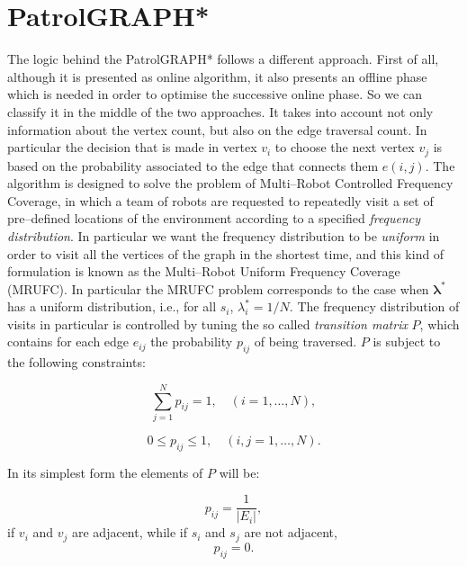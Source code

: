 \section{PatrolGRAPH*}

The logic behind the PatrolGRAPH* follows a different approach. First of all, although it is presented as online algorithm, it also presents an offline phase which is needed in order to optimise the successive online phase. So we can classify it in the middle of the two approaches. It takes into account not only information about the vertex count, but also on the edge traversal count. In particular the decision that is made in vertex $v_i$ to choose the next vertex $v_j$ is based on the probability associated to the edge that connects them $e(i,j)$.
The algorithm is designed to solve the problem of Multi--Robot Controlled Frequency Coverage, in which a team of robots are requested to repeatedly visit a set of pre--defined locations of the environment according to a specified \emph{frequency distribution}. In particular we want the frequency distribution to be \emph{uniform} in order to visit all the vertices of the graph in the shortest time, and this kind of formulation is known as the Multi--Robot Uniform Frequency Coverage (MRUFC). In particular the MRUFC problem corresponds to the case when ${\bm{\lambda}}^*$ has a uniform distribution, i.e., for all $s_i$, $\lambda_i^* = 1/N$.  The frequency distribution of visits in particular is controlled by tuning the so called \emph{transition matrix} $P$, which contains for each edge $e_{ij}$ the probability $p_{ij}$ of being traversed. $P$ is subject to the following constraints:

\begin{equation}
\sum\limits_{j=1}^{N} {p_{ij} } = 1, \quad (i=1,\ldots,N),
\label{Pmatrix3b}
\end{equation}

\begin{equation}
0 \leq p_{ij} \leq 1,\quad (i,j=1,\ldots,N). 
\label{Pmatrix3c}
\end{equation}
 
In its simplest form the elements of $P$ will be:

\begin{equation}
p_{ij}=\frac{1}{|E_i|},
\label{eq_adj}
\end{equation}
if $v_i$ and $v_j$ are adjacent, while if $s_i$ and $s_j$ are not adjacent,
\begin{equation}
p_{ij}=0.
\label{eq_noadj}
\end{equation}

